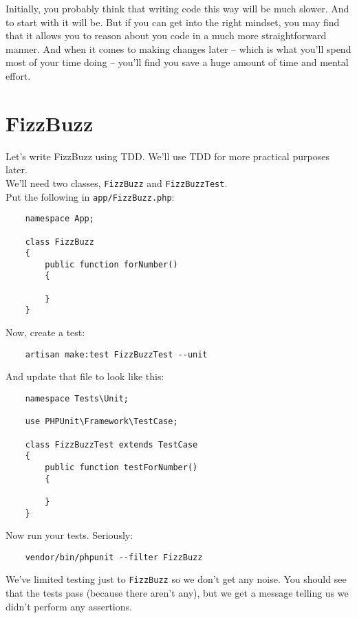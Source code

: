 Initially, you probably think that writing code this way will be much slower. And to start with it will be. But if you can get into the right mindset, you may find that it allows you to reason about you code in a much more straightforward manner. And when it comes to making changes later – which is what you'll spend most of your time doing – you'll find you save a huge amount of time and mental effort.

\section{FizzBuzz}

Let's write FizzBuzz using TDD. We'll use TDD for more practical purposes later.
\\

We'll need two classes, \texttt{FizzBuzz} and \texttt{FizzBuzzTest}.
\\

Put the following in \texttt{app/FizzBuzz.php}:

\begin{verbatim}
    namespace App;

    class FizzBuzz
    {
        public function forNumber()
        {

        }
    }
\end{verbatim}

Now, create a test:

\begin{verbatim}
    artisan make:test FizzBuzzTest --unit
\end{verbatim}

And update that file to look like this:

\begin{verbatim}
    namespace Tests\Unit;

    use PHPUnit\Framework\TestCase;

    class FizzBuzzTest extends TestCase
    {
        public function testForNumber()
        {

        }
    }
\end{verbatim}

Now run your tests. Seriously:

\begin{verbatim}
    vendor/bin/phpunit --filter FizzBuzz
\end{verbatim}

We've limited testing just to \texttt{FizzBuzz} so we don't get any noise. You should see that the tests pass (because there aren't any), but we get a message telling us we didn't perform any assertions.
\\

